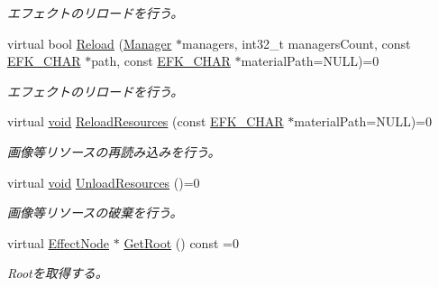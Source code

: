 \begin{DoxyCompactItemize}
\begin{DoxyCompactList}\small\item\em エフェクトのリロードを行う。 \end{DoxyCompactList}\item 
virtual bool \mbox{\hyperlink{class_effekseer_1_1_effect_aa3b78b38874183e8d9c52c03b791a691}{Reload}} (\mbox{\hyperlink{class_effekseer_1_1_manager}{Manager}} $\ast$managers, int32\+\_\+t managers\+Count, const \mbox{\hyperlink{_effekseer_8h_a50b026abea014b47854bcd835b3b6233}{E\+F\+K\+\_\+\+C\+H\+AR}} $\ast$path, const \mbox{\hyperlink{_effekseer_8h_a50b026abea014b47854bcd835b3b6233}{E\+F\+K\+\_\+\+C\+H\+AR}} $\ast$material\+Path=N\+U\+LL)=0
\begin{DoxyCompactList}\small\item\em エフェクトのリロードを行う。 \end{DoxyCompactList}\item 
virtual \mbox{\hyperlink{namespace_effekseer_ab34c4088e512200cf4c2716f168deb56}{void}} \mbox{\hyperlink{class_effekseer_1_1_effect_ae5c311df731ae2009aaee1bc8e6e98a3}{Reload\+Resources}} (const \mbox{\hyperlink{_effekseer_8h_a50b026abea014b47854bcd835b3b6233}{E\+F\+K\+\_\+\+C\+H\+AR}} $\ast$material\+Path=N\+U\+LL)=0
\begin{DoxyCompactList}\small\item\em 画像等リソースの再読み込みを行う。 \end{DoxyCompactList}\item 
virtual \mbox{\hyperlink{namespace_effekseer_ab34c4088e512200cf4c2716f168deb56}{void}} \mbox{\hyperlink{class_effekseer_1_1_effect_a5ed461f5a30a4282db026b500f9967dc}{Unload\+Resources}} ()=0
\begin{DoxyCompactList}\small\item\em 画像等リソースの破棄を行う。 \end{DoxyCompactList}\item 
virtual \mbox{\hyperlink{class_effekseer_1_1_effect_node}{Effect\+Node}} $\ast$ \mbox{\hyperlink{class_effekseer_1_1_effect_ad1b5285e9df73c44cb132d07b116d994}{Get\+Root}} () const =0
\begin{DoxyCompactList}\small\item\em Rootを取得する。 \end{DoxyCompactList}\end{DoxyCompactItemize}
